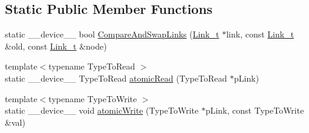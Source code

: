 \subsection*{Static Public Member Functions}
\begin{DoxyCompactItemize}
\item 
static \+\_\+\+\_\+device\+\_\+\+\_\+ bool \mbox{\hyperlink{class_n_u_c_a_r_lock_free_d_s_1_1_allocator_a44f1e3d3b32739a116a7acccae7b29db}{Compare\+And\+Swap\+Links}} (\mbox{\hyperlink{class_n_u_c_a_r_lock_free_d_s_1_1_allocator_a5508d82b795e6c1977bebb67b5e5b686}{Link\+\_\+t}} $\ast$link, const \mbox{\hyperlink{class_n_u_c_a_r_lock_free_d_s_1_1_allocator_a5508d82b795e6c1977bebb67b5e5b686}{Link\+\_\+t}} \&old, const \mbox{\hyperlink{class_n_u_c_a_r_lock_free_d_s_1_1_allocator_a5508d82b795e6c1977bebb67b5e5b686}{Link\+\_\+t}} \&node)
\item 
{\footnotesize template$<$typename Type\+To\+Read $>$ }\\static \+\_\+\+\_\+device\+\_\+\+\_\+ Type\+To\+Read \mbox{\hyperlink{class_n_u_c_a_r_lock_free_d_s_1_1_allocator_a1d1b9fa15fea39ba361ca1cdc5bfaeb9}{atomic\+Read}} (Type\+To\+Read $\ast$p\+Link)
\item 
{\footnotesize template$<$typename Type\+To\+Write $>$ }\\static \+\_\+\+\_\+device\+\_\+\+\_\+ void \mbox{\hyperlink{class_n_u_c_a_r_lock_free_d_s_1_1_allocator_abb86daaaec98eadd094bc3f6520bb1d8}{atomic\+Write}} (Type\+To\+Write $\ast$p\+Link, const Type\+To\+Write \&val)
\end{DoxyCompactItemize}
